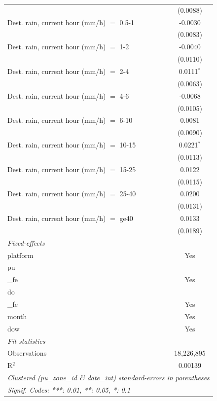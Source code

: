 \begin{tabular}{lc}
    & (0.0088)\\
   Dest. rain, current hour (mm/h) $=$ 0.5-1 & -0.0030\\
    & (0.0083)\\
   Dest. rain, current hour (mm/h) $=$ 1-2 & -0.0040\\
    & (0.0110)\\
   Dest. rain, current hour (mm/h) $=$ 2-4 & 0.0111$^{*}$\\
    & (0.0063)\\
   Dest. rain, current hour (mm/h) $=$ 4-6 & -0.0068\\
    & (0.0105)\\
   Dest. rain, current hour (mm/h) $=$ 6-10 & 0.0081\\
    & (0.0090)\\
   Dest. rain, current hour (mm/h) $=$ 10-15 & 0.0221$^{*}$\\
    & (0.0113)\\
   Dest. rain, current hour (mm/h) $=$ 15-25 & 0.0122\\
    & (0.0115)\\
   Dest. rain, current hour (mm/h) $=$ 25-40 & 0.0200\\
    & (0.0131)\\
   Dest. rain, current hour (mm/h) $=$ ge40 & 0.0133\\
    & (0.0189)\\
   \midrule
   \emph{Fixed-effects}\\
   platform & Yes\\
   pu\\_fe & Yes\\
   do\\_fe & Yes\\
   month & Yes\\
   dow & Yes\\
   \midrule
   \emph{Fit statistics}\\
   Observations & 18,226,895\\
   R$^2$ & 0.00139\\
   \midrule \midrule
   \multicolumn{2}{l}{\emph{Clustered (pu\_zone\_id \& date\_int) standard-errors in parentheses}}\\
   \multicolumn{2}{l}{\emph{Signif. Codes: ***: 0.01, **: 0.05, *: 0.1}}\\
\end{tabular}
 
